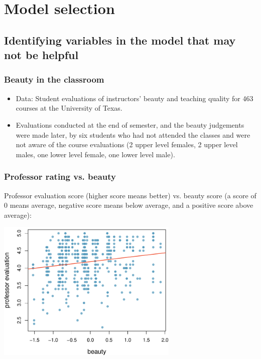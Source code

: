 
\section{Model selection}


\subsection{Identifying variables in the model that may not be helpful}


\begin{frame}
\frametitle{Beauty in the classroom}

\begin{itemize}

\item Data: Student evaluations of instructors' beauty and teaching quality for 463 courses at the University of Texas.

\item Evaluations conducted at the end of semester, and the beauty judgements were made later, by six students who had not attended the classes and were not aware of the course evaluations (2 upper level females, 2 upper level males, one lower level female, one lower level male).

\end{itemize}


\end{frame}


\begin{frame}
\frametitle{Professor rating vs. beauty}

Professor evaluation score (higher score means better) vs. beauty score (a score of 0 means average, negative score means below average, and a positive score above average):

\begin{center}
\includegraphics[width=0.65\textwidth]{9-2_model_select/figures/beauty/beauty_profeval}
\end{center}

\end{frame}

